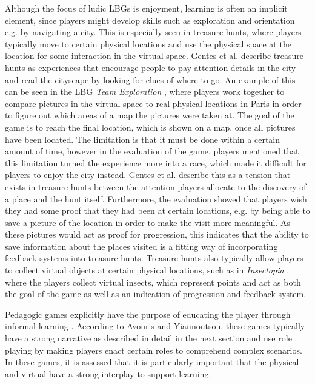 Although the focus of ludic LBGs is enjoyment, learning is often an implicit element, since players might develop skills such as exploration and orientation e.g. by navigating a city. This is especially seen in treasure hunts, where players typically move to certain physical locations and use the physical space at the location for some interaction in the virtual space. Gentes et al. describe treasure hunts as experiences that encourage people to pay attention details in the city and read the cityscape by looking for clues of where to go. An example of this can be seen in the LBG \textit{Team Exploration} \cite{GamingOnTheMove}, where players work together to compare pictures in the virtual space to real physical locations in Paris in order to figure out which areas of a map the pictures were taken at. The goal of the game is to reach the final location, which is shown on a map, once all pictures have been located. The limitation is that it must be done within a certain amount of time, however in the evaluation of the game, players mentioned that this limitation turned the experience more into a race, which made it difficult for players to enjoy the city instead. Gentes et al. \cite{GamingOnTheMove} describe this as a tension that exists in treasure hunts between the attention players allocate to the discovery of a place and the hunt itself. Furthermore, the evaluation showed that players wish they had some proof that they had been at certain locations, e.g. by being able to save a picture of the location in order to make the visit more meaningful. As these pictures would act as proof for progression, this indicates that the ability to save information about the places visited is a fitting way of incorporating feedback systems into treasure hunts. Treasure hunts also typically allow players to collect virtual objects at certain physical locations\cite{LBG_Review}, such as in \textit{Insectopia} \cite{Insectopia}, where the players collect virtual insects, which represent points and act as both the goal of the game as well as an indication of progression and feedback system.

Pedagogic games explicitly have the purpose of educating the player through informal learning \cite{LBG_Review}. According to Avouris and Yiannoutsou\cite{LBG_Review}, these games typically have a strong narrative as described in detail in the next section and use role playing by making players enact certain roles to comprehend complex scenarios. In these games, it is assessed that it is particularly important that the physical and virtual have a strong interplay to support learning. 

